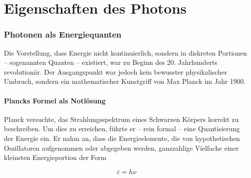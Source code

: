 \chapter{Eigenschaften des Photons}

\setcounter{section}{3}
\setcounter{subsection}{0}
\setcounter{subsubsection}{1}
\setcounter{secnumdepth}{3}

\subsection{Photonen als Energiequanten}

Die Vorstellung, dass Energie nicht kontinuierlich, sondern in diskreten Portionen – sogenannten Quanten – existiert, war zu Beginn des 20. Jahrhunderts revolutionär. Der Ausgangspunkt war jedoch kein bewusster physikalischer Umbruch, sondern ein mathematischer Kunstgriff von Max Planck im Jahr 1900.

\subsubsection{Plancks Formel als Notlösung}

Planck versuchte, das Strahlungsspektrum eines Schwarzen Körpers korrekt zu beschreiben. Um dies zu erreichen, führte er – rein formal – eine Quantisierung der Energie ein. Er nahm an, dass die Energieelemente, die von hypothetischen Oszillatoren aufgenommen oder abgegeben werden, ganzzahlige Vielfache einer kleinsten Energieportion der Form

\begin{equation}
	\varepsilon = h \nu
\end{equation}

